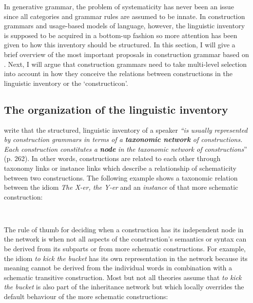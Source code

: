In generative grammar, the problem of systematicity has never been an issue since all categories and grammar rules are assumed to be innate. In construction grammars and usage-based models of language, however, the linguistic inventory is supposed to be acquired in a bottom-up fashion so more attention has been given to how this inventory should be structured. In this section, I will give a brief overview of the most important proposals in construction grammar based on \citet[p. 262--290]{croft04cognitive}. Next, I will argue that construction grammars need to take multi-level selection into account in how they conceive the relations between constructions in the linguistic inventory or the `constructicon'.

\subsection{The organization of the linguistic inventory}

\citet{croft04cognitive} write that the structured, linguistic inventory of a speaker {\em ``is usually represented by construction grammars in terms of a {\bfseries taxonomic network} of constructions. Each construction constitutes a {\bfseries node} in the taxonomic network of constructions}'' (p. 262). In other words, constructions are related to each other through taxonomy links or instance links which describe a relationship of schematicity between two constructions. The following example shows a taxonomic relation between the idiom {\em The X-er, the Y-er} and an {\em instance} of that more schematic construction:

\ea
\label{e:net1}
\\ \citep[p. 263, example 3]{croft04cognitive}
\z

The rule of thumb for deciding when a construction has its independent node in the network is when not all aspects of the construction's semantics or syntax can be derived from its subparts or from more schematic constructions. For example, the idiom {\em to kick the bucket} has its own representation in the network because its meaning cannot be derived from the individual words in combination with a schematic transitive construction. Most but not all theories assume that {\em to kick the bucket} is also part of the inheritance network but which locally overrides the default behaviour of the more schematic constructions:

